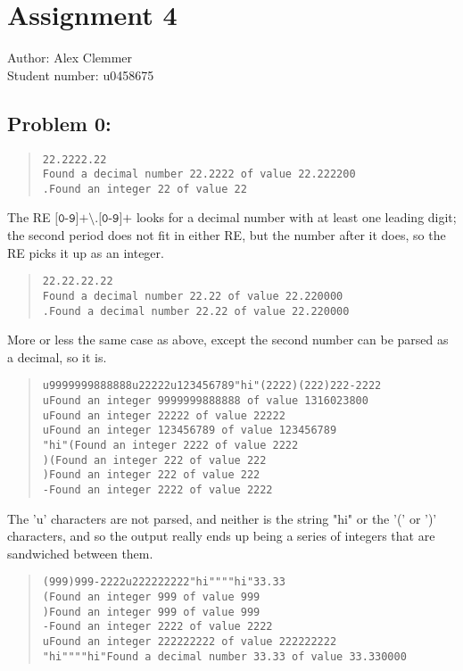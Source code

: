 \documentclass[a4paper]{article}
\begin{document}
\section*{Assignment 4 }
Author: Alex Clemmer\\
Student number: u0458675

\subsection*{Problem 0:}

\begin{quote}
\begin{verbatim}
22.2222.22
Found a decimal number 22.2222 of value 22.222200
.Found an integer 22 of value 22
\end{verbatim}
\end{quote}

The RE $\texttt{[0-9]+\textbackslash.[0-9]+}$ looks for a decimal number with at least one leading digit; the second period does not fit in either RE, but the number after it does, so the RE picks it up as an integer.

\begin{quote}
\begin{verbatim}
22.22.22.22
Found a decimal number 22.22 of value 22.220000
.Found a decimal number 22.22 of value 22.220000
\end{verbatim}
\end{quote}

More or less the same case as above, except the second number can be parsed as a decimal, so it is.

\begin{quote}
\begin{verbatim}
u9999999888888u22222u123456789"hi"(2222)(222)222-2222
uFound an integer 9999999888888 of value 1316023800
uFound an integer 22222 of value 22222
uFound an integer 123456789 of value 123456789
"hi"(Found an integer 2222 of value 2222
)(Found an integer 222 of value 222
)Found an integer 222 of value 222
-Found an integer 2222 of value 2222
\end{verbatim}
\end{quote}

The 'u' characters are not parsed, and neither is the string "hi" or the '(' or ')' characters, and so the output really ends up being a series of integers that are sandwiched between them.

\begin{quote}
\begin{verbatim}
(999)999-2222u222222222"hi""""hi"33.33
(Found an integer 999 of value 999
)Found an integer 999 of value 999
-Found an integer 2222 of value 2222
uFound an integer 222222222 of value 222222222
"hi""""hi"Found a decimal number 33.33 of value 33.330000
\end{verbatim}
\end{quote}
\end{document}
